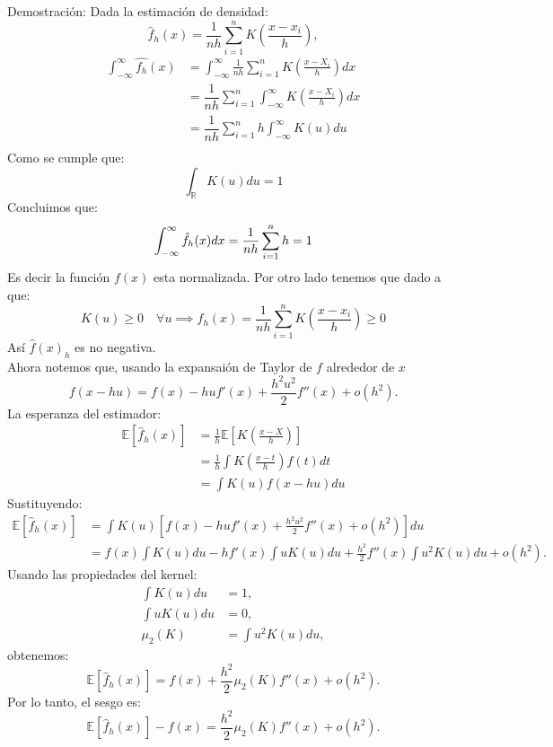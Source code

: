 \documentclass[a4paper,11pt]{article}
\begin{document}
\begin{demostracion}{Demostración:}
Dada la estimación de densidad:
\[
\hat{f}_{h}(x) = \frac{1}{nh} \sum_{i=1}^{n} K\left(\frac{x-x_i}{h}\right),
\]
    \begin{align*}
\int_{-\infty}^{\infty}\hat{f_h} (x)&=
\int_{-\infty}^{\infty} \frac{1}{nh} \sum_{i=1}^n K\left( \frac{x - X_i}{h} \right)dx\\
&=\dfrac{1}{nh}\sum_{i=1}^n\int_{-\infty}^{\infty}K\left( \frac{x - X_i}{h} \right)dx\\
&=\dfrac{1}{nh}\sum_{i=1}^n h\int_{-\infty}^{\infty}K\left(u\right)du\\
\end{align*}
Como se cumple que:
\[
\int_\mathbb{R}K(u)du=1
\]
Concluimos que:
\[
\int_{-\infty}^\infty \hat{f}_h(x)dx=\dfrac{1}{nh}\sum_{i=1}^n h=1 \\
\]
Es decir la función $f(x)$ esta normalizada.
Por otro lado tenemos que dado a que:
\[
K(u)\geq0 \quad\forall u\implies  \hat{f}_{h}(x) = \frac{1}{nh} \sum_{i=1}^{n} K\left(\frac{x-x_i}{h}\right)\geq0
\]
Así $\hat{f}(x)_h$ es no negativa.\\
Ahora notemos que, usando la expansaión de Taylor de $f$ alrededor de $x$
        \[
            f(x - hu) = f(x) - hu f'(x) + \frac{h^2 u^2}{2} f''(x) + o(h^2).
        \]
        La esperanza del estimador:
              \begin{align*}
            \mathbb{E}[\hat{f}_h(x)] 
            &= \frac{1}{h} \mathbb{E}\left[ K\left( \frac{x - X}{h} \right) \right] \\
            &= \frac{1}{h} \int K\left( \frac{x - t}{h} \right) f(t)  dt \\
            &= \int K(u) f(x - hu)  du 
        \end{align*}
        Sustituyendo:
        \begin{align*}
            \mathbb{E}[\hat{f}_h(x)] 
            &= \int K(u) \left[ f(x) - hu f'(x) + \frac{h^2 u^2}{2} f''(x) + o(h^2) \right] du \\
            &= f(x) \int K(u)  du - h f'(x) \int u K(u)  du + \frac{h^2}{2} f''(x) \int u^2 K(u)  du + o(h^2).
        \end{align*}
        Usando las propiedades del kernel:
        \begin{align*}
            \int K(u)  du &= 1, \\
            \int u K(u)  du &= 0, \\
            \mu_2(K) &= \int u^2 K(u)  du,
        \end{align*}
        obtenemos:
        \[
            \mathbb{E}[\hat{f}_h(x)] = f(x) + \frac{h^2}{2} \mu_2(K) f''(x) + o(h^2).
        \]
        Por lo tanto, el sesgo es:
        \[
            \mathbb{E}[\hat{f}_h(x)] - f(x) = \frac{h^2}{2} \mu_2(K) f''(x) + o(h^2).
        \]

\end{demostracion}
\end{document}
